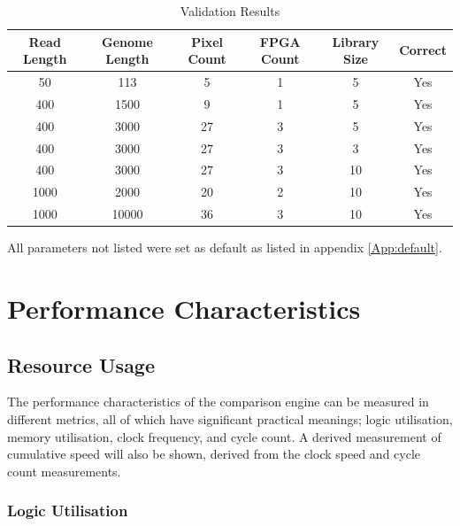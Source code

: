 \begin{table}[!h]
\centering %
\begin{tabular}{c c c c c c} %
\hline\hline %
Read Length & Genome Length & Pixel Count & FPGA Count & Library Size & Correct\\ [0.5ex] %
\hline %
50 & 113 & 5 & 1 & 5 & Yes \\ %
400 & 1500 & 9 & 1 & 5 & Yes \\%
400 & 3000 & 27 & 3 & 5 & Yes \\%
400 & 3000 & 27 & 3 & 3 & Yes \\%
400 & 3000 & 27 & 3 & 10 & Yes \\%
1000 & 2000 & 20 & 2 & 10 & Yes \\%
1000 & 10000 & 36 & 3 & 10 & Yes \\%
\hline
\end{tabular}
\caption{Validation Results} %
\label{table:nonlin}
\end{table}


All parameters not listed were set as default as listed in appendix \ref{App:default}. 



\section{Performance Characteristics}
\subsection{Resource Usage}
The performance characteristics of the comparison engine can be measured in different metrics, all of which have significant practical meanings; logic utilisation, memory utilisation, clock frequency, and cycle count. A derived measurement of cumulative speed will also be shown, derived from the clock speed and cycle count measurements.

\subsubsection{Logic Utilisation}


